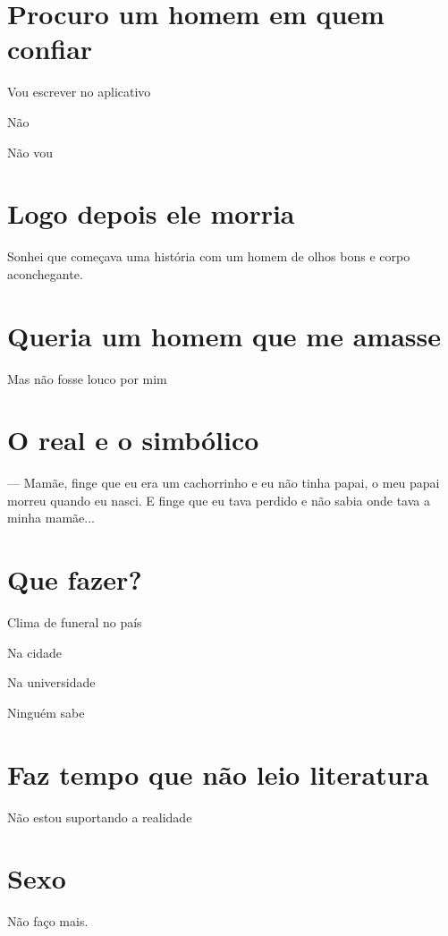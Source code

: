 {\parindent0pt\parskip1pt\raggedright

\chapter{Procuro um homem em quem
confiar}\label{procuro-um-homem-em-quem-confiar}

Vou escrever no aplicativo

Não

Não vou

\chapter{Logo depois ele morria}\label{logo-depois-ele-morria}

Sonhei que começava uma história com um homem de olhos bons e corpo
aconchegante.

\chapter{Queria um homem que me
amasse}\label{queria-um-homem-que-me-amasse}

Mas não fosse louco por mim


\chapter{O real e o simbólico}

--- Mamãe, finge que eu era um cachorrinho e eu não tinha papai, o meu
papai morreu quando eu nasci. E finge que eu tava perdido e não sabia
onde tava a minha mamãe...

\chapter{Que fazer?}\label{que-fazer}

Clima de funeral no país

Na cidade\medskip

Na universidade

Ninguém sabe

\chapter{Faz tempo que não leio literatura}

Não estou suportando a realidade

\chapter{Sexo}\label{sexo}

Não faço mais.}

